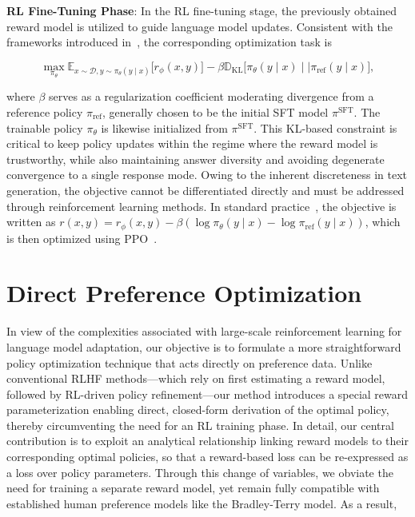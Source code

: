 \textbf{RL Fine-Tuning Phase}: In the RL fine-tuning stage, the previously obtained reward model is utilized to guide language model updates. Consistent with the frameworks introduced in~\citep{jaques2017sequence, jaques2020human}, the corresponding optimization task is

\begin{equation}\label{eq:RL}
\max_{\pi_{\theta}}  \mathbb{E}_{x\sim \mathcal{D}, y\sim \pi_{\theta}(y \mid x)}\bigl[r_{\phi}(x, y)\bigr] - \beta\mathbb{D}_{\textrm{KL}}\bigl[\pi_{\theta}(y\mid x)\mid \mid \pi_\text{ref}(y\mid x)\bigr],
\end{equation}

where $\beta$ serves as a regularization coefficient moderating divergence from a reference policy $\pi_\text{ref}$, generally chosen to be the initial SFT model $\pi^\text{SFT}$. The trainable policy $\pi_\theta$ is likewise initialized from $\pi^\text{SFT}$. This KL-based constraint is critical to keep policy updates within the regime where the reward model is trustworthy, while also maintaining answer diversity and avoiding degenerate convergence to a single response mode. Owing to the inherent discreteness in text generation, the objective cannot be differentiated directly and must be addressed through reinforcement learning methods. In standard practice~\citep{ziegler2020finetuning, stiennon2022learning, bai2022training, ouyang2022training}, the objective is written as ${r(x, y) = r_{\phi}(x, y) -\beta (\log \pi_{\theta}(y\mid x) - \log \pi_\text{ref}(y\mid x))}$, which is then optimized using PPO~\cite{schulman2017proximal}. 

\section{Direct Preference Optimization}\label{sec:DPO}

In view of the complexities associated with large-scale reinforcement learning for language model adaptation, our objective is to formulate a more straightforward policy optimization technique that acts directly on preference data. Unlike conventional RLHF methods—which rely on first estimating a reward model, followed by RL-driven policy refinement—our method introduces a special reward parameterization enabling direct, closed-form derivation of the optimal policy, thereby circumventing the need for an RL training phase. In detail, our central contribution is to exploit an analytical relationship linking reward models to their corresponding optimal policies, so that a reward-based loss can be re-expressed as a loss over policy parameters. Through this change of variables, we obviate the need for training a separate reward model, yet remain fully compatible with established human preference models like the Bradley-Terry model. As a result,

